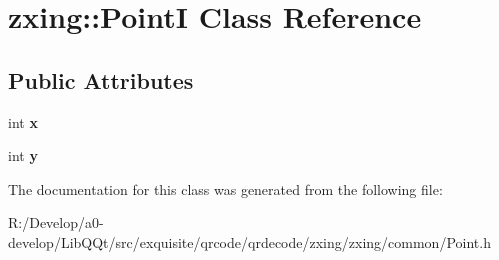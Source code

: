 \hypertarget{classzxing_1_1_point_i}{}\section{zxing\+:\+:PointI Class Reference}
\label{classzxing_1_1_point_i}
\subsection*{Public Attributes}
\begin{DoxyCompactItemize}
\item 
\mbox{\label{classzxing_1_1_point_i_a394c5accd58aa3f41084ec0cbadab01d}} 
int {\bfseries x}
\item 
\mbox{\label{classzxing_1_1_point_i_a1e2297a7b9b896b22ec0e8a48dc8f832}} 
int {\bfseries y}
\end{DoxyCompactItemize}


The documentation for this class was generated from the following file\+:\begin{DoxyCompactItemize}
\item 
R\+:/\+Develop/a0-\/develop/\+Lib\+Q\+Qt/src/exquisite/qrcode/qrdecode/zxing/zxing/common/Point.\+h\end{DoxyCompactItemize}
